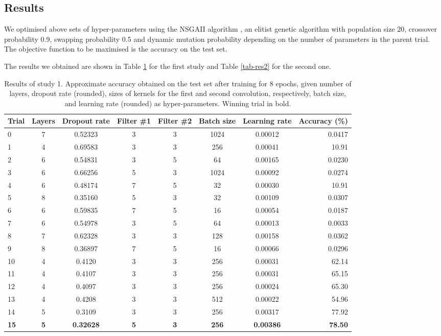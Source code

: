 \documentclass[british,12p]{article}
\begin{document}
    \subsection{Results}
    
    We optimised above sets of hyper-parameters using the NSGAII algorithm \cite{deb:02}, an elitist genetic algorithm with population size 20, crossover probability 0.9, swapping probability 0.5 and dynamic mutation probability depending on the number of parameters in the parent trial. The objective function to be maximised is the accuracy on the test set. 
    
    The results we obtained are shown in Table \ref{tab-res1} for the first study and Table \ref{tab-res2} for the second one.

    \begin{table}[h!]
    \begin{center}
    \begin{tabular}{l||c|c|c|c|c|c||r}
  		Trial & Layers & Dropout rate & Filter \#1 & Filter \#2 & Batch size & Learning rate & Accuracy (\%) \\
  		\hline\hline
  		0 & 7 & 0.52323 & 3 & 3 & 1024 & 0.00012 & 0.0417\\\hline
  		1 & 4 & 0.69583 & 3 & 3 & 256 & 0.00041 & 10.91\\\hline
  		2 & 6 & 0.54831 & 3 & 5 & 64 & 0.00165 & 0.0230\\\hline
  		3 & 6 & 0.66256 & 5 & 3 & 1024 & 0.00092 & 0.0274\\\hline
  		4 & 6 & 0.48174 & 7 & 5 & 32 & 0.00030 & 10.91\\\hline
  		5 & 8 & 0.35160 & 5 & 3 & 32 & 0.00109 & 0.0307\\\hline
  		6 & 6 & 0.59835 & 7 & 5 & 16 & 0.00054 & 0.0187\\\hline
  		7 & 6 & 0.54978 & 3 & 5 & 64 & 0.00013 & 0.0033\\\hline
  		8 & 7 & 0.62328 & 3 & 3 & 128 & 0.00158 & 0.0362\\\hline
  		9 & 8 & 0.36897 & 7 & 5 & 16 & 0.00066 & 0.0296\\\hline
  		10 & 4 & 0.4120 & 3 & 3 & 256 & 0.00031& 62.14\\\hline
  		11 & 4 & 0.4107 & 3 & 3 & 256 & 0.00031 & 65.15\\\hline
  		12 & 4 & 0.4097 & 3 & 3 & 256 & 0.00024& 65.30\\\hline
  		13 & 4 & 0.4208 & 3 & 3 & 512 & 0.00022 & 54.96\\\hline
  		14 & 5 & 0.3109 & 3 & 3 & 256 & 0.00317& 77.92 \\\hline
  		\textbf{15} & \textbf{5} & \textbf{0.32628} & \textbf{5} & \textbf{3} & \textbf{256} & \textbf{0.00386} & \textbf{78.50}
  		 
	\end{tabular}
	\caption{Results of study 1. Approximate accuracy obtained on the test set after training for 8 epochs, given number of layers, dropout rate (rounded), sizes of kernels for the first and second convolution, respectively, batch size, and learning rate (rounded) as hyper-parameters. Winning trial in bold.}
	\label{tab-res1}
	\end{center}
	 \end{table}
	 
\end{document}
